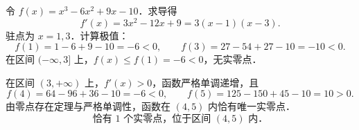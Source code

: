 \begin{solution}

    令 $f(x) = x^3 - 6x^2 + 9x - 10$．求导得
    \begin{equation}
        f'(x) = 3x^2 - 12x + 9 = 3(x-1)(x-3).
    \end{equation}
    驻点为 $x = 1, 3$．计算极值：
    \begin{equation}
        f(1) = 1 - 6 + 9 - 10 = -6 < 0, \qquad f(3) = 27 - 54 + 27 - 10 = -10 < 0.
    \end{equation}
    在区间 $(-\infty, 3]$ 上，$f(x) \leqslant f(1) = -6 < 0$，无实零点．

    在区间 $(3, +\infty)$ 上，$f'(x) > 0$，函数严格单调递增，且
    \begin{equation}
        f(4) = 64 - 96 + 36 - 10 = -6 < 0, \qquad f(5) = 125 - 150 + 45 - 10 = 10 > 0.
    \end{equation}
    由零点存在定理与严格单调性，函数在 $(4, 5)$ 内恰有唯一实零点．
    \begin{equation}
        \boxed{\text{恰有 } 1 \text{ 个实零点，位于区间 } (4, 5) \text{ 内．}}
    \end{equation}



\end{solution}

